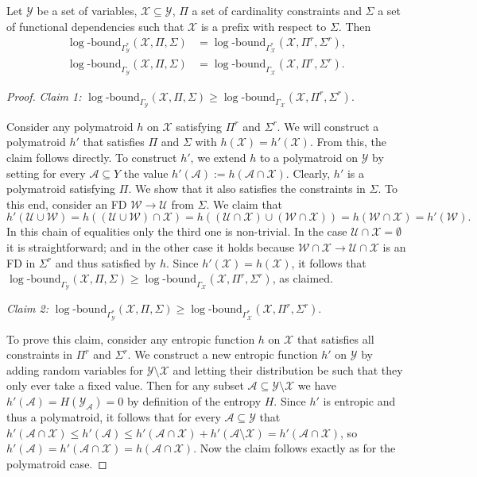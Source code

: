 \documentclass[a4paper,cleveref]{lipics-v2021}
\newcommand{\logb}{\mathrm{\log\text{-}bound}}
\newcommand{\vset}[1]{\mathcal{#1}}
\begin{document}
\begin{lemma}\label{lem:tightproject}
	Let $\vset Y$ be a set of variables, $\vset X\subseteq \vset Y$, $\Pi$ a set of cardinality constraints and $\Sigma$ a set of functional dependencies such that $\vset X$ is a prefix with respect to $\Sigma$. Then
	\begin{align*}
		\logb_{\Gamma^*_{\vset Y}}(\vset X, \Pi, \Sigma) &= \logb_{\Gamma^*_{\vset X}}(\vset X, \Pi^r, \Sigma^r),\\
		\logb_{\Gamma_{\vset Y}}(\vset X, \Pi, \Sigma) &= \logb_{\Gamma_{\vset X}}(\vset X, \Pi^r, \Sigma^r).
	\end{align*}
\end{lemma}
%
%
\begin{proof}
\emph{Claim 1:}	 $\logb_{\Gamma_{\vset Y}}(\vset X, \Pi, \Sigma) \ge \logb_{\Gamma_{\vset X}}(\vset X, \Pi^r, \Sigma^r)$. 

Consider any polymatroid $h$ on $\vset X$ satisfying $\Pi^r$ and $\Sigma^r$. We will construct a polymatroid $h'$ that satisfies $\Pi$ and $\Sigma$ with $h(\vset X)= h'(\vset X)$. From this, the claim follows directly. To construct $h'$, we extend $h$ to a polymatroid on $\vset Y$ by setting for every $\vset A\subseteq Y$ the value $h'(\vset A) := h(\vset A\cap \vset X)$. Clearly, $h'$ is a polymatroid satisfying $\Pi$. We show that it also satisfies the constraints in $\Sigma$. To this end, consider an FD $\vset W\rightarrow \vset U$ from $\Sigma$. We claim that
\[
h'(\vset U\cup \vset W) = h((\vset U\cup \vset W)\cap \vset X) = h((\vset U\cap \vset X)\cup (\vset W\cap \vset X)) = h(\vset W\cap \vset X) = h'(\vset W).
\] 
In this chain of equalities only the third one is non-trivial. In the case $\vset U \cap \vset X = \emptyset$ it is straightforward; 
and in the other case it
holds because $\vset W \cap \vset X \rightarrow \vset U\cap \vset X$ is an FD in $\Sigma^r$ and thus satisfied by $h$. 
Since $h'(\vset X) = h(\vset X)$, it follows that $\logb_{\Gamma_{\vset Y}}(\vset X, \Pi, \Sigma) \ge \logb_{\Gamma_{\vset X}}(\vset X, \Pi^r, \Sigma^r)$, as claimed.


\smallskip
	 
\emph{Claim 2:} $\logb_{\Gamma^*_{\vset Y}}(\vset X, \Pi, \Sigma) \ge \logb_{\Gamma^*_{\vset X}}(\vset X, \Pi^r, \Sigma^r)$. 

To prove this claim, consider any entropic function $h$ on $\vset X$ that satisfies all constraints in $\Pi^r$ and $\Sigma^r$. We construct a new entropic function $h'$ on $\vset Y$ by adding random variables for $\vset Y\setminus \vset X$ and letting their distribution be such that they only ever take a fixed value. Then for any subset $\vset A\subseteq \vset Y\setminus \vset X$ we have $h'(\vset A) = H(\vset Y_{\vset A}) = 0$ by definition of the entropy $H$. Since $h'$ is entropic and thus a polymatroid, it follows that for every $\vset A\subseteq \vset Y$ that $h'(\vset A\cap \vset X) \le h'(\vset A) \le h'(\vset A\cap \vset X) + h'(\vset A\setminus \vset X) = h'(\vset A\cap \vset X)$, so $h'(\vset A) = h'(\vset A \cap \vset X) = h(\vset A\cap \vset X)$. Now the claim follows exactly as for the polymatroid case.
	

\end{proof}
\end{document}
